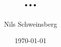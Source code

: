 


\title{...}

\author{Nils Schweinsberg}
\subject{Computational Physics Praktikum, WS 2012/13}

\publishers{Betreut durch ...}

\date{\today}



\maketitle
\tableofcontents
\newpage

%
%

%


%
%


